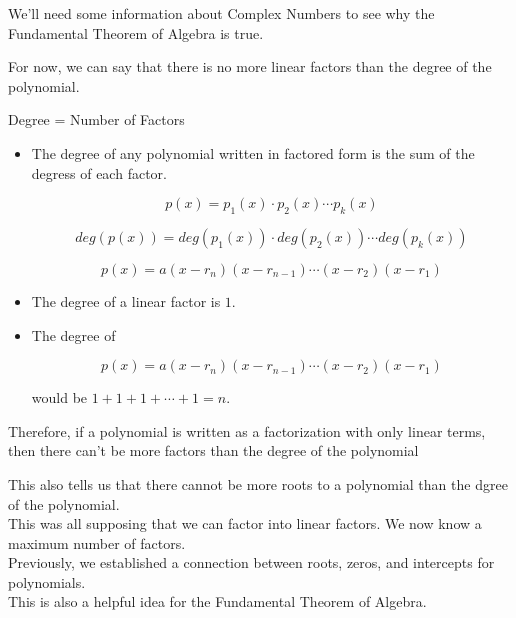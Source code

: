 \documentclass{ximera}
\begin{document}
We'll need some information about Complex Numbers to see why the Fundamental Theorem of Algebra is true.

For now, we can say that there is no more linear factors than the degree of the polynomial.



\begin{idea} Degree = Number of Factors \\


\begin{itemize}
\item The degree of any polynomial written in factored form is the sum of the degress of each factor.

\[
 p(x) = p_1(x) \cdot p_2(x) \cdots p_k(x)
\]

\[
deg(p(x)) = deg(p_1(x)) \cdot deg(p_2(x)) \cdots deg(p_k(x))
\]


\[
 p(x) = a (x - r_n) (x - r_{n-1}) \cdots (x - r_2)  (x - r_1) 
\]

\item The degree of a linear factor is $1$. \\

\item The degree of 

\[
p(x) = a (x - r_n) (x - r_{n-1}) \cdots (x - r_2)  (x - r_1) 
\]

would be $1 + 1 + 1 + \cdots + 1 = n$.
\end{itemize}



Therefore, if a polynomial is written as a factorization with only linear terms, then there can't be more factors than the degree of the polynomial

\end{idea}

This also tells us that there cannot be more roots to a polynomial than the dgree of the polynomial. \\


This was all supposing that we can factor into linear factors.  We now know a maximum number of factors. \\




Previously, we established a connection between roots, zeros, and intercepts for polynomials. \\


This is also a helpful idea for the Fundamental Theorem of Algebra. \\
\end{document}
